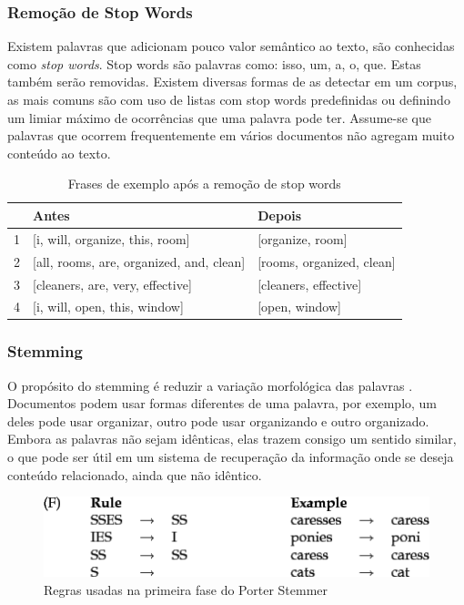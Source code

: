 \subsubsection{Remoção de Stop Words}
Existem palavras que adicionam pouco valor semântico ao texto, são conhecidas como \textit{stop words}. Stop words são palavras como: isso, um, a, o, que. Estas também serão removidas. Existem diversas formas de as detectar em um corpus, as mais comuns são com uso de listas com stop words predefinidas ou definindo um limiar máximo de ocorrências que uma palavra pode ter. Assume-se que palavras que ocorrem frequentemente em vários documentos não agregam muito conteúdo ao texto.

\begin{table}[htb]
	\centering
    \def\arraystretch{1.2} %
    \begin{tabular}{|l|l|l|}
        \hline
        & \textbf{Antes} & \textbf{Depois} \\ \hline
        1 & [i, will, organize, this, room] & [organize, room]            \\ \hline
        2 & [all, rooms, are, organized, and, clean] & [rooms, organized, clean] \\ \hline
        3 & [cleaners, are, very, effective] & [cleaners, effective]                              \\ \hline
        4 & [i, will, open, this, window] & [open, window]                             \\ \hline
    \end{tabular}
	\caption{Frases de exemplo após a remoção de stop words}
    \label{tab:tokenfilter}
\end{table}

\subsubsection{Stemming}
O propósito do stemming é reduzir a variação morfológica das palavras \cite{stemmingdef}. Documentos podem usar formas diferentes de uma palavra, por exemplo, um deles pode usar organizar, outro pode usar organizando e outro organizado. Embora as palavras não sejam idênticas, elas trazem consigo um sentido similar, o que pode ser útil em um sistema de recuperação da informação onde se deseja conteúdo relacionado, ainda que não idêntico.

\begin{figure}[htb]
	\centering
	\includegraphics[width=\textwidth]{chapters/project/porterrules.png}
	\caption{Regras usadas na primeira fase do Porter Stemmer}
    \label{fig:porterstemmerprocess}
\end{figure}

